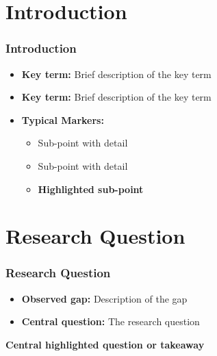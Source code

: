 \documentclass[aspectratio=169]{beamer}
\begin{document}

\section{Introduction}

\begin{frame}
  \frametitle{Introduction}
  \begin{itemize}
    \item \textbf{Key term:} Brief description of the key term
    \item \textbf{Key term:} Brief description of the key term
    \item \textbf{Typical Markers:} 
    \begin{itemize}
      \item Sub-point with detail
      \item Sub-point with detail
      \item \textcolor{RWTHblue}{\textbf{Highlighted sub-point}}
    \end{itemize}
  \end{itemize}  
\end{frame}


\section{Research Question}

\begin{frame}
  \frametitle{Research Question}
  \begin{itemize}
    \item[\checkmark] \textbf{Observed gap:} Description of the gap
    \item[\checkmark] \textbf{Central question:} The research question
  \end{itemize}

  \vspace{0.8cm}
  \begin{center}
    \textcolor{RWTHblue}{\Large \textbf{Central highlighted question or takeaway}}
  \end{center}
\end{frame}
\end{document}
